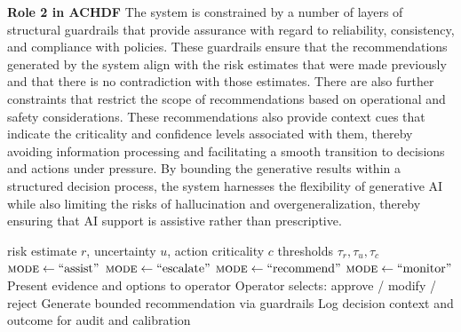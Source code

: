 \documentclass[journal]{IEEEtran}
\theoremstyle{plain}
\theoremstyle{definition}
\begin{document}
    \textbf{Role 2 in ACHDF}
    The system is constrained by a number of layers of structural guardrails that provide assurance with regard to reliability, consistency, and compliance with policies. These guardrails ensure that the recommendations generated by the system align with the risk estimates that were made previously and that there is no contradiction with those estimates.
    There are also further constraints that restrict the scope of recommendations based on operational and safety considerations. These recommendations also provide context cues that indicate the criticality and confidence levels associated with them, thereby avoiding information processing and facilitating a smooth transition to decisions and actions under pressure.
    By bounding the generative results within a structured decision process, the system harnesses the flexibility of generative AI while also limiting the risks of hallucination and overgeneralization, thereby ensuring that AI support is assistive rather than prescriptive.
    \begin{algorithm}[t]
        \caption{Uncertainty-aware escalation and human override policy}
        \label{alg:escalation}
        \begin{algorithmic}[1]
            \Require risk estimate $r$, uncertainty $u$, action criticality $c$
            \Require thresholds $\tau_r, \tau_u, \tau_c$
            \State $\textsc{mode} \leftarrow \text{``assist''}$
            \State $\textsc{mode} \leftarrow \text{``escalate''}$ 
            \State $\textsc{mode} \leftarrow \text{``recommend''}$
            \Else
            \State $\textsc{mode} \leftarrow \text{``monitor''}$
            \EndIf
            \State Present evidence and options to operator
            \State Operator selects: approve / modify / reject
            \Else
            \State Generate bounded recommendation via guardrails
            \EndIf
            \State Log decision context and outcome for audit and calibration
        \end{algorithmic}
    \end{algorithm}
    
\end{document}
